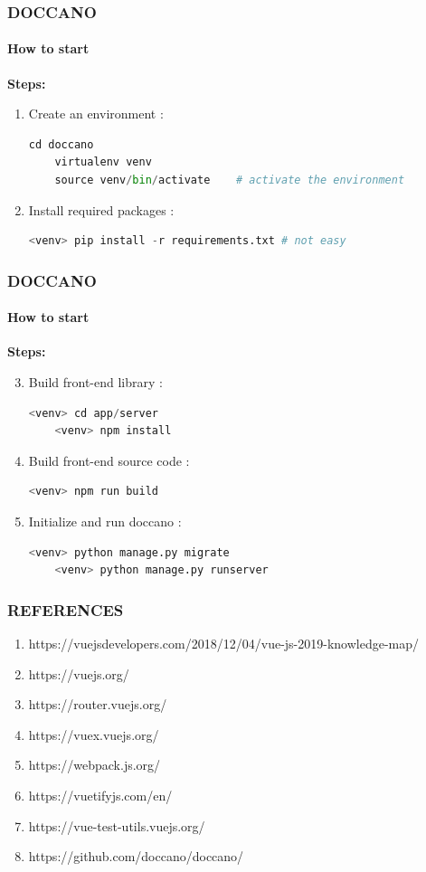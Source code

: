\documentclass[10pt]{beamer}
\begin{document}
\begin{frame}[fragile]
    \frametitle{\textbf{DOCCANO}}
    \framesubtitle{\textbf{How to start}}
    \large{\textbf{Steps:}}
    \begin{enumerate}
        \item Create an environment : 
        \begin{lstlisting}[language=Python]
    cd doccano
    virtualenv venv
    source venv/bin/activate    # activate the environment
        \end{lstlisting}
        \item Install required packages :
        \begin{lstlisting}[language=Python]
    <venv> pip install -r requirements.txt # not easy
        \end{lstlisting}
    \end{enumerate}
\end{frame}
\begin{frame}[fragile]
    \frametitle{\textbf{DOCCANO}}
    \framesubtitle{\textbf{How to start}}
    \large{\textbf{Steps:}}
    \begin{enumerate}
        \setcounter{enumi}{2}
        \item Build front-end library : 
        \begin{lstlisting}[language=Python]
    <venv> cd app/server
    <venv> npm install 
        \end{lstlisting}
        \item Build front-end source code : 
        \begin{lstlisting}[language=Python]
    <venv> npm run build
        \end{lstlisting}
        \item Initialize and run doccano : 
        \begin{lstlisting}[language=Python]
    <venv> python manage.py migrate
    <venv> python manage.py runserver
        \end{lstlisting}
    \end{enumerate}
\end{frame}
\begin{frame}
    \frametitle{\textbf{REFERENCES}}
    \begin{enumerate}
        \item https://vuejsdevelopers.com/2018/12/04/vue-js-2019-knowledge-map/ 
        \item https://vuejs.org/ 
        \item https://router.vuejs.org/ 
        \item https://vuex.vuejs.org/
        \item https://webpack.js.org/ 
        \item https://vuetifyjs.com/en/
        \item https://vue-test-utils.vuejs.org/
        \item https://github.com/doccano/doccano/ 
    \end{enumerate}
\end{frame}
\end{document}
